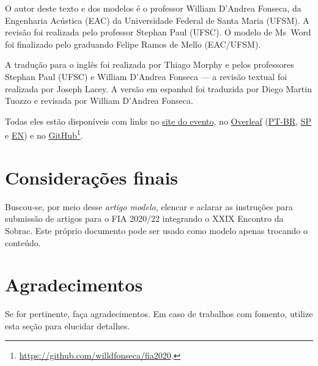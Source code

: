 \documentclass[12pt, a4paper, twoside, twocolumn]{article}
\begin{document}
O autor deste texto e dos modelos é o professor William D'Andrea Fonseca, da Engenharia Acústica (EAC) da Universidade Federal de Santa Maria (UFSM).
A revisão foi realizada pelo professor Stephan Paul (UFSC).
O modelo de Ms~Word foi finalizado pelo graduando Felipe Ramos de Mello (EAC/UFSM).

A tradução para o inglês foi realizada por Thiago Morphy e pelos professores Stephan Paul (UFSC) e William D'Andrea Fonseca --- a revisão textual foi realizada por Joseph Lacey. 
%
A versão em espanhol foi traduzida por Diego Martin Tuozzo e revisada por William D'Andrea Fonseca.


Todas eles estão disponíveis com links no \href{http://www.fia2022.com.br}{site do evento}, no \href{https://www.overleaf.com/read/rnfjxkknksnd}{Overleaf} (\href{https://www.overleaf.com/read/rnfjxkknksnd}{PT-BR}, \href{https://www.overleaf.com/read/rszcxtwshzfr}{SP} e \href{https://www.overleaf.com/read/hgryywpgmxdx}{EN}) e no \href{https://github.com/willdfonseca/fia2020}{GitHub}\footnote{\url{https://github.com/willdfonseca/fia2020}.}.

\section{Considerações finais}

Buscou-se, por meio desse \textit{artigo modelo}, elencar e aclarar as instruções para submissão de artigos para o FIA 2020/22 integrando o XXIX Encontro da Sobrac. 
Este próprio documento pode ser usado como modelo apenas trocando o conteúdo.

\section{Agradecimentos}

Se for pertinente, faça agradecimentos.
%
Em caso de trabalhos com fomento, utilize esta seção para elucidar detalhes.
\end{document}
